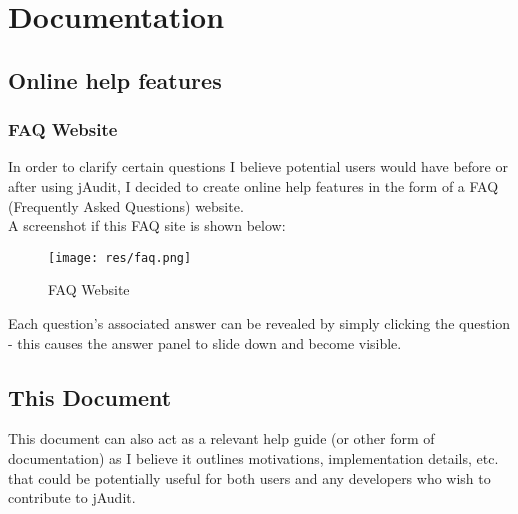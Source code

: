 \documentclass[9pt]{article}
\begin{document}
\section{Documentation}
	\subsection{Online help features}

		\subsubsection{FAQ Website}

				In order to clarify certain questions I believe potential users would
				have before or after using jAudit, I decided to create online help
				features in the form of a FAQ (Frequently Asked Questions)
				website.\\

				A screenshot if this FAQ site is shown below:

				\begin{figure}[H]
					\centering
					\texttt{[image: res/faq.png]}
					\caption{FAQ Website}
				\end{figure}
				
				Each question's associated answer can be revealed by simply clicking
				the question - this causes the answer panel to slide down and become
				visible.\\

	\subsection{This Document}
		
		This document can also act as a relevant help guide (or other form of
		documentation) as I believe it outlines motivations, implementation
		details, etc. that could be potentially useful for both users and any
		developers who wish to contribute to jAudit.
\end{document}
